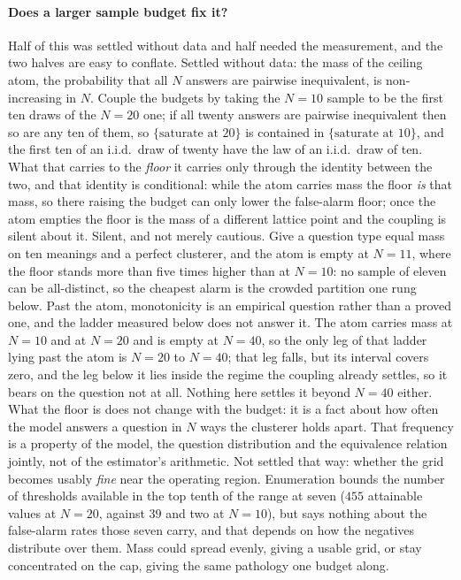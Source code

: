 \paragraph{Does a larger sample budget fix it?}
Half of this was settled without data and half needed the measurement, and the two halves
are easy to conflate. Settled without data: the mass of the ceiling atom, the probability that
all $N$ answers are pairwise inequivalent, is non-increasing in $N$. Couple the budgets by taking the
$N{=}10$ sample to be the first ten draws of the $N{=}20$ one; if all twenty answers are
pairwise inequivalent then so are any ten of them, so $\{\text{saturate at }20\}$ is
contained in $\{\text{saturate at }10\}$, and the first ten of an i.i.d.\ draw of twenty have
the law of an i.i.d.\ draw of ten. What that carries to the \emph{floor} it carries only
through the identity between the two, and that identity is conditional: while the atom carries
mass the floor \emph{is} that mass, so there raising the budget can only lower the false-alarm
floor; once the atom empties the floor is the mass of a different lattice point and the
coupling is silent about it. Silent, and not merely cautious. Give a question type equal mass
on ten meanings and a perfect clusterer, and the atom is empty at $N{=}11$, where the floor
stands more than five times higher than at $N{=}10$: no sample of eleven can be all-distinct,
so the cheapest alarm is the crowded partition one rung below. Past the atom, monotonicity is
an empirical question rather than a proved one, and the ladder measured below does not answer
it. The atom carries mass at $N{=}10$ and at $N{=}20$ and is empty at $N{=}40$, so the only leg
of that ladder lying past the atom is $N{=}20$ to $N{=}40$; that leg falls, but its interval
covers zero, and the leg below it lies inside the regime the coupling already settles, so it
bears on the question not at all. Nothing here settles it beyond $N{=}40$ either.
What the floor is does not change with the budget: it is a fact about
how often the model answers a question in $N$ ways the clusterer holds apart. That frequency
is a property of the model, the question distribution and the equivalence relation jointly, not of
the estimator's arithmetic. Not settled that way: whether the grid becomes usably
\emph{fine} near the operating region. Enumeration bounds the number of thresholds available in the top tenth of
the range at seven ($455$ attainable values at $N{=}20$, against $39$ and two at $N{=}10$),
but says nothing about the false-alarm rates those seven carry, and that depends on how the
negatives distribute over them. Mass could spread evenly, giving a usable grid, or stay
concentrated on the cap, giving the same pathology one budget along.

